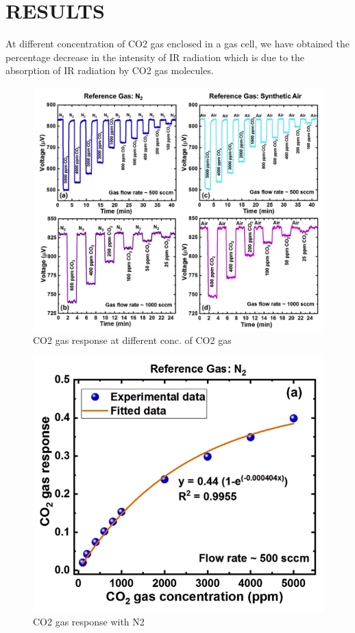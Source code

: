 \documentclass[12pt]{article}
\begin{document}
\section{RESULTS}
At different concentration of CO2 gas enclosed in a gas cell, we have obtained the percentage decrease in the intensity of IR radiation which is due to the absorption of IR radiation by CO2 gas molecules. 

\begin{figure}[h]
\centering
\includegraphics[scale=0.5]{gas response.png}
\caption{CO2 gas response at different conc. of CO2 gas}
\label{CO2 gas response at different conc. of CO2 gas}
\end{figure}

\begin{figure}[h]
\centering
\includegraphics[scale=0.5]{CO2 gas response in presence of N2.png}
\caption{CO2 gas response with N2}
\label{CO2 gas response with N2}
\end{figure}
\clearpage
\end{document}
